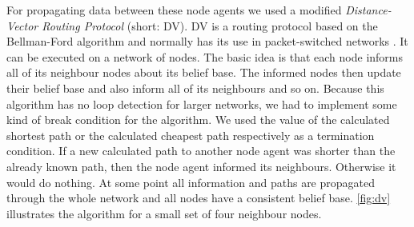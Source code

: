 For propagating data between these node agents we used a modified \emph{Distance-Vector Routing Protocol} (short: DV).
DV is a routing protocol based on the Bellman-Ford algorithm and normally has its use in packet-switched networks \cite{dvrp}.
It can be executed on a network of nodes.
The basic idea is that each node informs all of its neighbour nodes about its belief base.
The informed nodes then update their belief base and also inform all of its neighbours and so on.
Because this algorithm has no loop detection for larger networks, we had to implement some kind of break condition for the algorithm.
We used the value of the calculated shortest path or the calculated cheapest path respectively as a termination condition.
If a new calculated path to another node agent was shorter than the already known path, then the node agent informed its neighbours.
Otherwise it would do nothing.
At some point all information and paths are propagated through the whole network and all nodes have a consistent belief base.
\autoref{fig:dv} illustrates the algorithm for a small set of four neighbour nodes.

